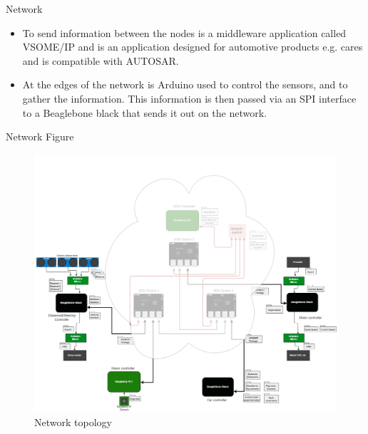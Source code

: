 \documentclass[final,hyperref={pdfpagelabels=false}]{beamer}
\begin{document}
\begin{frame}[t]
\begin{columns}[t]
\begin{column}{.465\textwidth}
\begin{block}{Network}
\begin{itemize}
        \item To send information between the nodes is a middleware application called VSOME/IP and is an application designed for automotive products e.g. cares and is compatible with AUTOSAR. 
        
        \item At the edges of the network is Arduino used to control the sensors, and to gather the information. This information is then passed via an SPI interface to a Beaglebone black that sends it out on the network.  
    \end{itemize}

    

\end{block}

\begin{block}{Network Figure}
    \begin{figure}
        \includegraphics[width=1\linewidth]{network.png}
        \caption{Network topology}
        \label{pic:network}
        \end{figure}
    
\end{block}



%	





\end{column}
\end{columns}
\end{frame}
\end{document}

